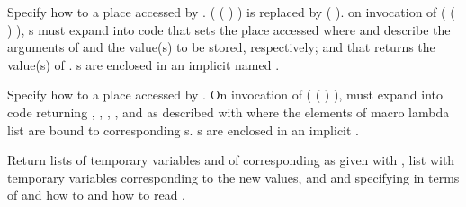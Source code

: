 \begin{LIST}{1cm}
  {
    Specify how to  a place accessed by
    .
     ( ( ) ) is
    replaced by (  ).
     on invocation of ( (
    ) ), s must expand
    into code that sets the place accessed where 
    and  describe the arguments of  and
    the value(s) to be stored, respectively; and that returns
    the value(s) of . s are enclosed in an
    implicit  named .
  }

  {
  Specify how to  a place accessed by
  . On invocation of ( (
    ) ),  must expand
    into code returning , , ,
    , and  as described with
     where the elements of macro
    lambda list  are bound to corresponding
    s. s are enclosed in an implicit  .
  }

  {
    Return lists of temporary variables  and of
    corresponding  as given with ,
    list  with temporary variables
    corresponding to the new values, and 
    and  specifying in terms of 
    and  how to  and how to read
    . 
  }


\end{LIST}
